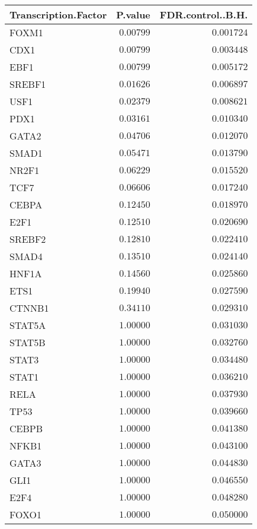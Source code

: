 \begin{table}[!tbp]
\begin{center}
\begin{tabular}{lrr}
\toprule
\multicolumn{1}{c}{Transcription.Factor}&\multicolumn{1}{c}{P.value}&\multicolumn{1}{c}{FDR.control..B.H.}\tabularnewline
\midrule
FOXM1&$0.00799$&$0.001724$\tabularnewline
CDX1&$0.00799$&$0.003448$\tabularnewline
EBF1&$0.00799$&$0.005172$\tabularnewline
SREBF1&$0.01626$&$0.006897$\tabularnewline
USF1&$0.02379$&$0.008621$\tabularnewline
PDX1&$0.03161$&$0.010340$\tabularnewline
GATA2&$0.04706$&$0.012070$\tabularnewline
SMAD1&$0.05471$&$0.013790$\tabularnewline
NR2F1&$0.06229$&$0.015520$\tabularnewline
TCF7&$0.06606$&$0.017240$\tabularnewline
CEBPA&$0.12450$&$0.018970$\tabularnewline
E2F1&$0.12510$&$0.020690$\tabularnewline
SREBF2&$0.12810$&$0.022410$\tabularnewline
SMAD4&$0.13510$&$0.024140$\tabularnewline
HNF1A&$0.14560$&$0.025860$\tabularnewline
ETS1&$0.19940$&$0.027590$\tabularnewline
CTNNB1&$0.34110$&$0.029310$\tabularnewline
STAT5A&$1.00000$&$0.031030$\tabularnewline
STAT5B&$1.00000$&$0.032760$\tabularnewline
STAT3&$1.00000$&$0.034480$\tabularnewline
STAT1&$1.00000$&$0.036210$\tabularnewline
RELA&$1.00000$&$0.037930$\tabularnewline
TP53&$1.00000$&$0.039660$\tabularnewline
CEBPB&$1.00000$&$0.041380$\tabularnewline
NFKB1&$1.00000$&$0.043100$\tabularnewline
GATA3&$1.00000$&$0.044830$\tabularnewline
GLI1&$1.00000$&$0.046550$\tabularnewline
E2F4&$1.00000$&$0.048280$\tabularnewline
FOXO1&$1.00000$&$0.050000$\tabularnewline
\bottomrule
\end{tabular}\end{center}

\end{table}
